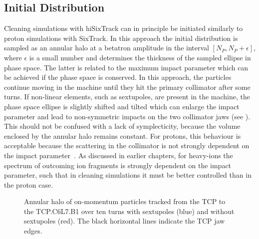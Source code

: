 \subsection{Initial Distribution} \label{chap:pha_shift}

Cleaning simulations with hiSixTrack can in principle be initiated similarly to proton simulations with SixTrack. In this approach the initial distribution is sampled as an annular halo at a betatron amplitude in the interval $[N_P, N_P+\epsilon]$, where $\epsilon$ is a small number and determines the thickness of the sampled ellipse in phase space. The latter is related to the maximum impact parameter which can be achieved if the phase space is conserved. In this approach, the particles continue moving in the machine until they hit the primary collimator after some turns. If non-linear elements, such as sextupoles, are present in the machine, the phase space ellipse is slightly shifted and tilted which can enlarge the impact parameter and lead to non-symmetric impacts on the two collimator jaws (see ). This should not be confused with a lack of symplecticity, because the volume enclosed by the annular halo remains constant. For protons, this behaviour is acceptable because the scattering in the collimator is not strongly dependent on the impact parameter~\cite{Bruce2014a}. As discussed in earlier chapters, for heavy-ions the spectrum of outcoming ion fragments is strongly dependent on the impact parameter, such that in cleaning simulations it must be better controlled than in the proton case.


\begin{figure}[htbp]
  \centering
  \caption{Annular halo of on-momentum particles tracked from the TCP to the TCP.C6L7.B1 over ten turns with sextupoles (blue) and without sextupoles (red). The black horizontal lines indicate the TCP jaw edges.}  
  \label{pic:16070603}
  \end{figure}

